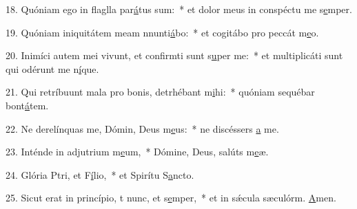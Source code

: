 18. Quóniam ego in flaglla par\uline{á}tus sum:~* et dolor meus in conspéctu me s\uline{e}mper.\par 
19. Quóniam iniquitátem meam nnunti\uline{á}bo:~* et cogitábo pro peccát m\uline{e}o.\par 
20. Inimíci autem mei vivunt, et confirmti sunt s\uline{u}per me:~* et multiplicáti sunt qui odérunt me n\uline{í}que.\par 
21. Qui retríbuunt mala pro bonis, detrhébant m\uline{i}hi:~* quóniam sequébar bont\uline{á}tem.\par 
22. Ne derelínquas me, Dómin, Deus m\uline{e}us:~* ne discéssers \uline{a} me.\par 
23. Inténde in adjutrium m\uline{e}um,~* Dómine, Deus, salúts m\uline{e}æ.\par 
24. Glória Ptri, et F\uline{í}lio,~* et Spirítu S\uline{a}ncto.\par 
25. Sicut erat in princípio, t nunc, et s\uline{e}mper,~* et in sǽcula sæculórm. \uline{A}men.\par 
